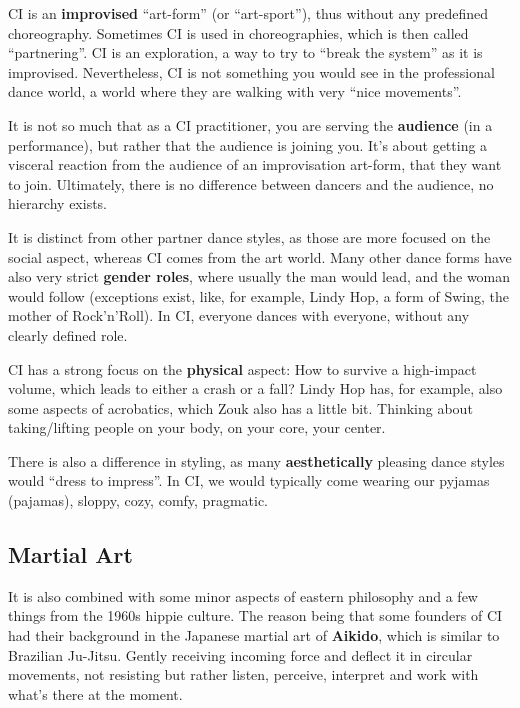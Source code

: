 CI is an \textbf{improvised} ``art-form'' (or ``art-sport''), thus without any predefined choreography.
Sometimes CI is used in choreographies, which is then called ``partnering''.
CI is an exploration, a way to try to ``break the system'' as it is improvised.
Nevertheless, CI is not something you would see in the professional dance world, a world where they are walking with very ``nice movements''.

It is not so much that as a CI practitioner, you are serving the \textbf{audience} (in a performance), but rather that the audience is joining you.
It's about getting a visceral reaction from the audience of an improvisation art-form, that they want to join.
Ultimately, there is no difference between dancers and the audience, no hierarchy exists.

It is distinct from other partner dance styles, as those are more focused on the social aspect, whereas CI comes from the art world.
Many other dance forms have also very strict \textbf{gender roles}, where usually the man would lead, and the woman would follow (exceptions exist, like, for example, Lindy Hop, a form of Swing, the mother of Rock'n'Roll).
In CI, everyone dances with everyone, without any clearly defined role.

CI has a strong focus on the \textbf{physical} aspect: How to survive a high-impact volume, which leads to either a crash or a fall?
Lindy Hop has, for example, also some aspects of acrobatics, which Zouk also has a little bit.
Thinking about taking/lifting people on your body, on your core, your center.

There is also a difference in styling, as many \textbf{aesthetically} pleasing dance styles would ``dress to impress''.
In CI, we would typically come wearing our pyjamas (pajamas), sloppy, cozy, comfy, pragmatic.

\subsection{Martial Art}\label{subsec:martial-art}

It is also combined with some minor aspects of eastern philosophy and a few things from the 1960s hippie culture.
The reason being that some founders of CI had their background in the Japanese martial art of \textbf{Aikido}, which is similar to Brazilian Ju-Jitsu.
Gently receiving incoming force and deflect it in circular movements, not resisting but rather listen, perceive, interpret and work with what's there at the moment.


